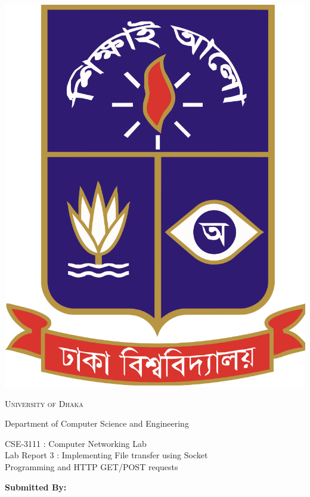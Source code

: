 \documentclass[11pt]{article}
\begin{document}
\begin{titlepage}
    \begin{center}
        \includegraphics[scale=0.10]{du.png}\par
        \begin{Huge}
            \textsc{University of Dhaka}\par
        \end{Huge}
        \begin{Large}
            Department of Computer Science and Engineering\par \vspace{1cm}
            CSE-3111 : Computer Networking Lab \\[12pt]   
            Lab Report 3 : Implementing File transfer using Socket \\[8pt] Programming and HTTP GET/POST requests
        \end{Large}
    \end{center}     
    \begin{large}
        \textbf{Submitted By:\\[12pt]}

\end{large}
\end{titlepage}
\end{document}
